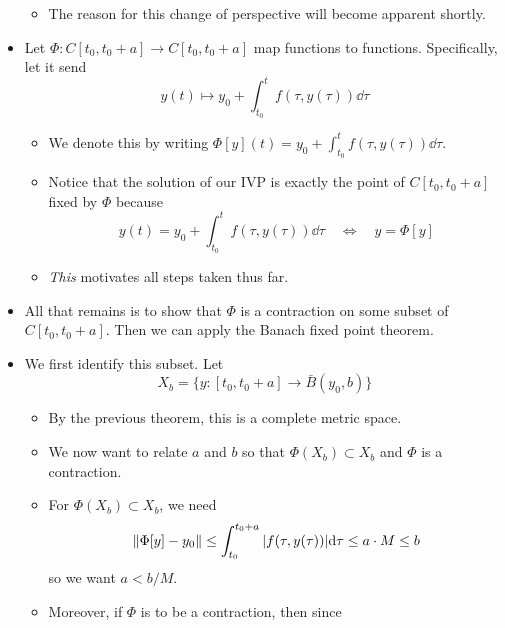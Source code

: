 \documentclass[../notes.tex]{subfiles}
\begin{document}
\begin{itemize}
\begin{equation*}
    \end{equation*}
    \begin{itemize}
        \item The reason for this change of perspective will become apparent shortly.
    \end{itemize}
    \item Let $\Phi:C[t_0,t_0+a]\to C[t_0,t_0+a]$ map functions to functions. Specifically, let it send
    \begin{equation*}
        y(t) \mapsto y_0+\int_{t_0}^tf(\tau,y(\tau))\dd\tau
    \end{equation*}
    \begin{itemize}
        \item We denote this by writing $\Phi[y](t)=y_0+\int_{t_0}^tf(\tau,y(\tau))\dd\tau$.
        \item Notice that the solution of our IVP is exactly the point of $C[t_0,t_0+a]$ fixed by $\Phi$ because
        \begin{equation*}
            y(t) = y_0+\int_{t_0}^tf(\tau,y(\tau))\dd\tau
            \quad\Longleftrightarrow\quad
            y = \Phi[y]
        \end{equation*}
        \item \emph{This} motivates all steps taken thus far.
    \end{itemize}
    \item All that remains is to show that $\Phi$ is a contraction on some subset of $C[t_0,t_0+a]$. Then we can apply the Banach fixed point theorem.
    \item We first identify this subset. Let
    \begin{equation*}
        X_b = \{y:[t_0,t_0+a]\to\bar{B}(y_0,b)\}
    \end{equation*}
    \begin{itemize}
        \item By the previous theorem, this is a complete metric space.
        \item We now want to relate $a$ and $b$ so that $\Phi(X_b)\subset X_b$ and $\Phi$ is a contraction.
        \item For $\Phi(X_b)\subset X_b$, we need
        \begin{equation*}
            \norm{\Phi[y]-y_0} \leq \int_{t_0}^{t_0+a}|f(\tau,y(\tau))|\dd\tau
            \leq a\cdot M
            \leq b
        \end{equation*}
        so we want $a<b/M$.
        \item Moreover, if $\Phi$ is to be a contraction, then since

\end{itemize}
\end{itemize}
\end{document}
